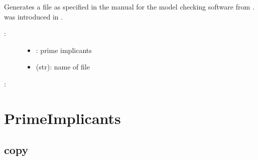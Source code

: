 \documentclass[letterpaper,10pt,english]{sphinxmanual}
\begin{document}
\begin{fulllineitems}
\label{\detokenize{FileExchange:PyBoolNet.FileExchange.primes2eqn}}
Generates a  file as specified in the manual for the model checking software  from .
 was introduced in {\hyperref[\detokenize{Bibliography:arellano2011}]{}}.
\begin{description}
\item[{:}] \leavevmode\begin{itemize}
\item {} 
: prime implicants

\item {} 
 (str): name of  file

\end{itemize}

\end{description}

:

\begin{sphinxVerbatim}[commandchars=\\\{\}]
 
\end{sphinxVerbatim}

\end{fulllineitems}



\section{PrimeImplicants}
\label{\detokenize{PrimeImplicants:networkx-has-path}}\label{\detokenize{PrimeImplicants::doc}}\label{\detokenize{PrimeImplicants:primeimplicants}}\label{\detokenize{PrimeImplicants:id1}}

\subsection{copy}
\label{\detokenize{PrimeImplicants:copy}}\label{\detokenize{PrimeImplicants:primes-copy}}
\end{document}

